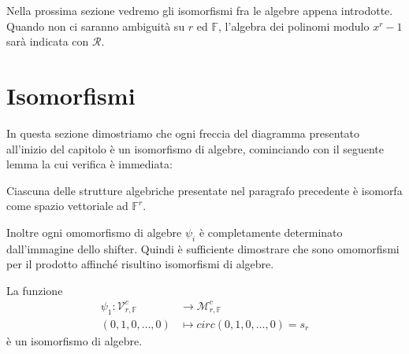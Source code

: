 Nella prossima sezione vedremo gli isomorfismi fra le algebre appena introdotte. 
Quando non ci saranno ambiguità su $r$ ed $\mathbb{F}$, l'algebra dei polinomi
modulo $x^{r} -1$ sarà indicata con $\mathcal{R}$.



\section{Isomorfismi}

In questa sezione dimostriamo che ogni freccia del diagramma presentato
all'inizio del capitolo è un isomorfismo di algebre, cominciando con il seguente lemma la cui verifica è immediata:
\begin{lemmax}
Ciascuna delle strutture algebriche presentate nel paragrafo precedente è
isomorfa come spazio vettoriale ad $\mathbb{F}^r$.
\end{lemmax}
\noindent
Inoltre ogni omomorfismo di algebre $\psi_{i}$ è completamente determinato
dall'immagine dello shifter. Quindi è sufficiente dimostrare che sono
omomorfismi per il prodotto
affinché risultino isomorfismi di algebre.

\begin{prop}
La funzione
\begin{align*}
\psi_{1}: \mathcal{V}_{r, \mathbb{F}}^{c} 
          &\longrightarrow  
          \mathcal{M}_{r,\mathbb{F} }^{c}  \\
              (0,1,0,\dots , 0) 
              &\longmapsto 
              circ(0,1,0,\dots , 0) = s_{r}
\end{align*}
è un isomorfismo di algebre.
\end{prop}

